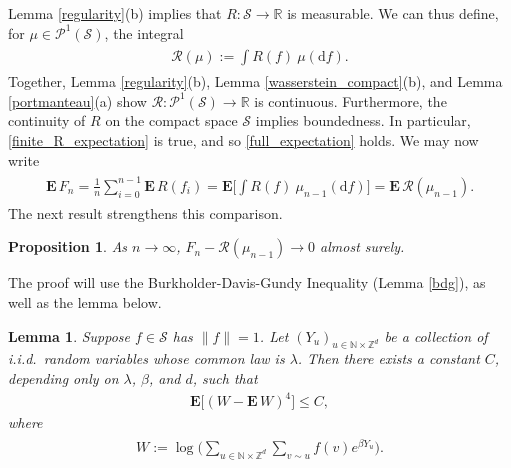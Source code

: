\documentclass[11pt,reqno]{amsart}
\numberwithin{equation}{section}
\newtheorem{prop}[thm]{Proposition}
\newtheorem{lemma}[thm]{Lemma}
\theoremstyle{definition}
\begin{document}
Lemma \ref{regularity}(b) implies that $R : {\mathcal{S}} \to {\mathbb{R}}$ is measurable.
We can thus define, for $\mu \in {\mathcal{P}}^1({\mathcal{S}})$, the integral
{\begin{align} \begin{split} {
{\mathcal{R}}(\mu) := \int R(f)\ \mu({\mathrm{d}} f). \label{R_def2}
} \end{split} \end{align}}
Together, Lemma \ref{regularity}(b), Lemma \ref{wasserstein_compact}(b), and Lemma \ref{portmanteau}(a) show ${\mathcal{R}} : {\mathcal{P}}^1({\mathcal{S}}) \to {\mathbb{R}}$ is continuous.
Furthermore, the continuity of $R$ on the compact space ${\mathcal{S}}$ implies boundedness.
In particular, \eqref{finite_R_expectation} is true, and so \eqref{full_expectation} holds.
We may now write
{\begin{align} \begin{split} {
{\mathbf{E}}\, F_n = \frac{1}{n} \sum_{i = 0}^{n-1} {\mathbf{E}}\, R(f_i) 
= {\mathbf{E}}\bigg[\int R(f)\ \mu_{n-1}({\mathrm{d}} f)\bigg] 
= {\mathbf{E}}\, {\mathcal{R}}(\mu_{n-1}). \label{expectations_equal}
} \end{split} \end{align}}
The next result strengthens this comparison.

\begin{prop} \label{FR_prop}
As $n \to \infty$, $F_n - {\mathcal{R}}(\mu_{n-1}) \to 0$ almost surely.
\end{prop}

The proof will use the Burkholder-Davis-Gundy Inequality (Lemma \ref{bdg}), as well as the lemma below.

\begin{lemma} \label{variance_lemma}
Suppose $f \in {\mathcal{S}}$ has $\|f\| = 1$.
Let $(Y_u)_{u \in {\mathbb{N}} \times {\mathbb{Z}}^d}$ be a collection of i.i.d.~random variables whose common law is $\lambda$.
Then there exists a constant $C$, depending only on $\lambda$, $\beta$, and $d$, such that
{\begin{align*} {
{\mathbf{E}}\big[(W - {\mathbf{E}}\, W)^4\big] \leq C,
} \end{align*}}
where
{\begin{align} \begin{split} {
W := \log \bigg(\sum_{u \in {\mathbb{N}} \times {\mathbb{Z}}^d} \sum_{v \sim u} f(v) e^{\beta Y_u}\bigg). \label{W_def}
} \end{split} \end{align}}
\end{lemma}
\end{document}
